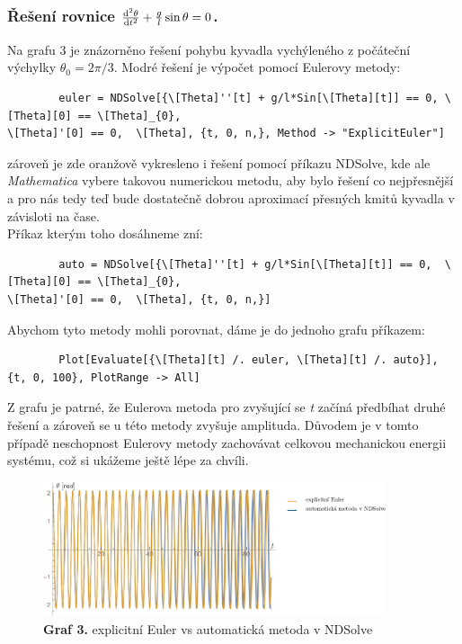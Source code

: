 \documentclass[reqno, a4paper]{amsart}
\begin{document}
		\subsubsection{Řešení rovnice \textit{$\frac{\mathrm{d}^2 {\theta}}{\mathrm{d} {t}^2} + \frac{g}{l} \sin \theta = 0$}.}Na grafu 3 je znázorněno řešení pohybu kyvadla vychýleného z počáteční výchylky $\theta_{0}=2\pi/3$. Modré řešení je výpočet pomocí Eulerovy metody: 
		\begin{verbatim}
		euler = NDSolve[{\[Theta]''[t] + g/l*Sin[\[Theta][t]] == 0, \[Theta][0] == \[Theta]_{0}, 
\[Theta]'[0] == 0,  \[Theta], {t, 0, n,}, Method -> "ExplicitEuler"]
		\end{verbatim}
		zároveň je zde oranžově vykresleno i řešení pomocí příkazu NDSolve, kde ale \textit{Mathematica} vybere takovou numerickou metodu, aby bylo řešení co nejpřesnější a pro nás tedy teď bude dostatečně dobrou aproximací přesných kmitů kyvadla v závisloti na čase. 
		\\
		Příkaz kterým toho dosáhneme zní:
		\begin{verbatim}
		auto = NDSolve[{\[Theta]''[t] + g/l*Sin[\[Theta][t]] == 0, 	\[Theta][0] == \[Theta]_{0}, 
\[Theta]'[0] == 0,  \[Theta], {t, 0, n,}]
		\end{verbatim}	
		Abychom tyto metody mohli porovnat, dáme je do jednoho grafu příkazem:
		\begin{verbatim}
		Plot[Evaluate[{\[Theta][t] /. euler, \[Theta][t] /. auto}], {t, 0, 100}, PlotRange -> All]
		\end{verbatim}	
		Z grafu je patrné, že Eulerova metoda pro zvyšující se \textit{t} začíná předbíhat druhé řešení a zároveň se u  této metody zvyšuje amplituda. Důvodem je v tomto případě neschopnost Eulerovy metody zachovávat celkovou mechanickou energii systému, což si ukážeme ještě lépe za chvíli.
		\begin{figure}[h]
			\centering
			\includegraphics[width=0.9\textwidth]{vs}
			\caption*{\textbf{Graf 3.} explicitní Euler vs automatická metoda v NDSolve}  
		\end{figure}
		\\
		\\
\end{document}
